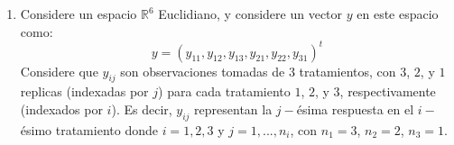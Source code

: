 \documentclass[12pt,a4paper]{report}
\begin{document}
\begin{enumerate}
\begin{enumerate}
\begin{align*}
{\begin{pmatrix}
2\\
-3\\
2\\
4\\
\end{pmatrix}}{\begin{pmatrix}
2\\
-3\\
2\\
4\\
\end{pmatrix}\begin{pmatrix}
2\\
-3\\
2\\
4\\
\end{pmatrix}}\begin{pmatrix}
2\\
-3\\
2\\
4\\
\end{pmatrix}\\
&=-\dfrac{18}{18}\begin{pmatrix}
1\\
-2\\
2\\
-3\\
\end{pmatrix}+\dfrac{33}{33}\begin{pmatrix}
2\\
-3\\
2\\
4\\
\end{pmatrix}\\
&=\begin{pmatrix}
3\\
-5\\
4\\
1\\
\end{pmatrix}
\end{align*}
\end{enumerate}




\item Considere un espacio $\mathbb{R}^6$ Euclidiano, y considere un vector $y$ en este espacio como:
\[y = (y_{11},y_{12},y_{13}, y_{21}, y_{22}, y_{31})^t\]
Considere que $y_{ij}$ son observaciones tomadas de $3$ tratamientos, con $3$, $2$, y $1$ replicas (indexadas por $j$) para cada tratamiento $1$, $2$, y $3$, respectivamente (indexados por $i$). Es decir, $y_{ij}$ representan la $j-$ésima respuesta en el $i-$ésimo tratamiento donde $i = 1, 2, 3$ y $j = 1, ..., n_i$, con $n_1 = 3$, $n_2 = 2$, $n_3 = 1$.


\end{enumerate}
\end{document}
